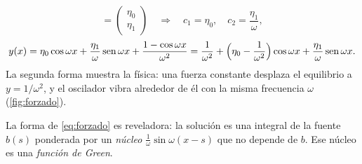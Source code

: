 \begin{ejemplo}[Oscilador forzado, $y''+\omega^{2}y=b(x)$, con $\omega>0$]
\begin{enumerate}[label=\textcolor{cian}{\arabic*.}, leftmargin=1.5em, itemsep=4pt]
\[          =\begin{pmatrix}\eta_0\\ \eta_1\end{pmatrix}
          \quad\Longrightarrow\quad
          c_1=\eta_0,\quad c_2=\frac{\eta_1}{\omega},
        \]
        \[
          y(x)=\eta_0\cos\omega x+\frac{\eta_1}{\omega}\sin\omega x+\frac{1-\cos\omega x}{\omega^{2}}
          =\frac{1}{\omega^{2}}+\Bigl(\eta_0-\frac{1}{\omega^{2}}\Bigr)\cos\omega x+\frac{\eta_1}{\omega}\sin\omega x .
        \]
        La segunda forma muestra la física: una fuerza constante desplaza
        el equilibrio a $y=1/\omega^{2}$, y el oscilador vibra alrededor de
        él con la misma frecuencia $\omega$ (\cref{fig:forzado}).
\end{enumerate}
\end{ejemplo}



La forma de \eqref{eq:forzado} es reveladora: la solución es una integral
de la fuente $b(s)$ ponderada por un \emph{núcleo}
$\frac1\omega\sin\omega(x-s)$ que no depende de $b$. Ese núcleo es una
\emph{función de Green}.
